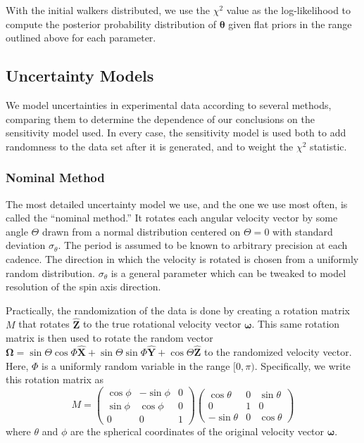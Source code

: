 \documentclass[11pt]{article}
\newcommand{\unit}[1]{\hat{\mathbf{#1}}}
\newcommand{\parens}[1]{\left( #1 \right)}
\begin{document}
With the initial walkers distributed, we use the $\chi^2$ value as the log-likelihood to compute the posterior probability distribution of $\bm \theta$ given flat priors in the range outlined above for each parameter.


\subsection{Uncertainty Models}
\label{sec:uncertainty-models}
We model uncertainties in experimental data according to several methods, comparing them to determine the dependence of our conclusions on the sensitivity model used. In every case, the sensitivity model is used both to add randomness to the data set after it is generated, and to weight the $\chi^2$ statistic.

\subsubsection{Nominal Method}
The most detailed uncertainty model we use, and the one we use most often, is called the ``nominal method.'' It rotates each angular velocity vector by some angle $\Theta$ drawn from a normal distribution centered on $\Theta=0$ with standard deviation $\sigma_\theta$. The period is assumed to be known to arbitrary precision at each cadence. The direction in which the velocity is rotated is chosen from a uniformly random distribution. $\sigma_\theta$ is a general parameter which can be tweaked to model resolution of the spin axis direction.

Practically, the randomization of the data is done by creating a rotation matrix $M$ that rotates $\unit Z$ to the true rotational velocity vector $\bm \omega$. This same rotation matrix is then used to rotate the random vector $\bm \Omega = \sin \Theta \cos\Phi \unit X + \sin \Theta \sin \Phi\unit Y + \cos \Theta\unit Z$ to the randomized velocity vector. Here, $\Phi$ is a uniformly random variable in the range $[0, \pi)$. Specifically, we write this rotation matrix as
\begin{equation}
M = \parens{\begin{matrix}
\cos \phi & -\sin \phi & 0\\
\sin \phi & \cos \phi & 0\\
0 & 0 & 1
\end{matrix}}
\parens{\begin{matrix}
\cos \theta & 0 & \sin \theta \\
0 & 1 & 0\\
-\sin \theta & 0 & \cos \theta
\end{matrix}}
\label{eqn:rotate-uncertainty-matrix}
\end{equation}
where $\theta$ and $\phi$ are the spherical coordinates of the original velocity vector $\bm \omega.$
\end{document}
